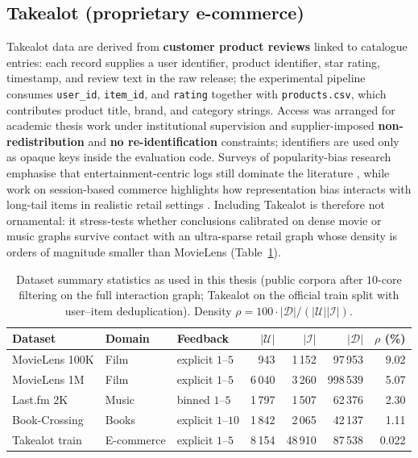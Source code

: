 \subsection{Takealot (proprietary e-commerce)}
Takealot data are derived from \textbf{customer product reviews} linked to catalogue entries: each record supplies a user identifier, product identifier, star rating, timestamp, and review text in the raw release; the experimental pipeline consumes \texttt{user\_id}, \texttt{item\_id}, and \texttt{rating} together with \texttt{products.csv}, which contributes product title, brand, and category strings. Access was arranged for academic thesis work under institutional supervision and supplier-imposed \textbf{non-redistribution} and \textbf{no re-identification} constraints; identifiers are used only as opaque keys inside the evaluation code. Surveys of popularity-bias research emphasise that entertainment-centric logs still dominate the literature \citep{klimashevskaia2024survey}, while work on session-based commerce highlights how representation bias interacts with long-tail items in realistic retail settings \citep{gupta2019niser}. Including Takealot is therefore not ornamental: it stress-tests whether conclusions calibrated on dense movie or music graphs survive contact with an ultra-sparse retail graph whose density is orders of magnitude smaller than MovieLens (Table~\ref{tab:dataset_comparison}).

\begin{table}[htbp]
  \centering
  \caption{Dataset summary statistics as used in this thesis (public corpora after $10$-core filtering on the full interaction graph; Takealot on the official train split with user--item deduplication). Density $\rho = 100\cdot|\mathcal{D}|/(|\mathcal{U}||\mathcal{I}|)$.}
  \label{tab:dataset_comparison}
  \begin{tabular}{@{}l l l r r r r@{}}
    \toprule
    \textbf{Dataset} & \textbf{Domain} & \textbf{Feedback} & \textbf{$|\mathcal{U}|$} & \textbf{$|\mathcal{I}|$} & \textbf{$|\mathcal{D}|$} & \textbf{$\rho$ (\%)} \\
    \midrule
    MovieLens 100K & Film & explicit $1$--$5$ & 943 & 1\,152 & 97\,953 & 9.02 \\
    MovieLens 1M   & Film & explicit $1$--$5$ & 6\,040 & 3\,260 & 998\,539 & 5.07 \\
    Last.fm 2K     & Music & binned $1$--$5$ & 1\,797 & 1\,507 & 62\,376 & 2.30 \\
    Book-Crossing  & Books & explicit $1$--$10$ & 1\,842 & 2\,065 & 42\,137 & 1.11 \\
    Takealot train & E-commerce & explicit $1$--$5$ & 8\,154 & 48\,910 & 87\,538 & 0.022 \\
    \bottomrule
  \end{tabular}
\end{table}


